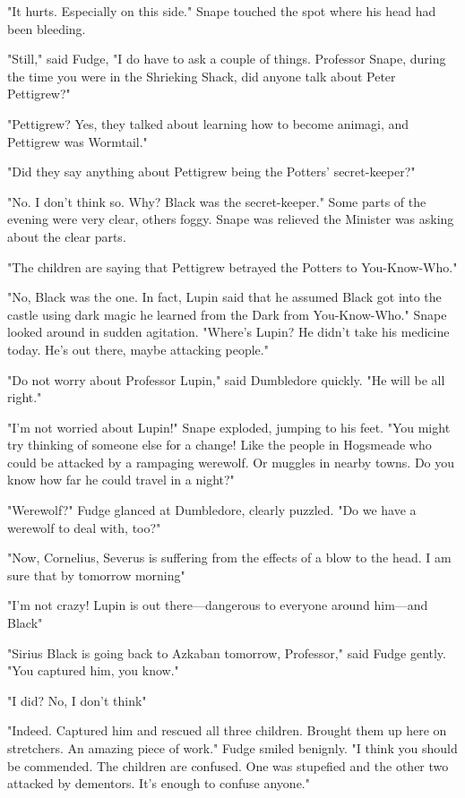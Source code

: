 "It hurts. Especially on this side." Snape touched the spot where his head had been bleeding.

"Still," said Fudge, "I do have to ask a couple of things. Professor Snape, during the time you were in the Shrieking Shack, did anyone talk about Peter Pettigrew?"

"Pettigrew? Yes, they talked about learning how to become animagi, and Pettigrew was Wormtail."

"Did they say anything about Pettigrew being the Potters' secret-keeper?"

"No. I don't think so. Why? Black was the secret-keeper." Some parts of the evening were very clear, others foggy. Snape was relieved the Minister was asking about the clear parts.

"The children are saying that Pettigrew betrayed the Potters to{\el} You-Know-Who."

"No, Black was the one. In fact, Lupin said that he assumed Black got into the castle using dark magic he learned from the Dark{\el} from You-Know-Who." Snape looked around in sudden agitation. "Where's Lupin? He didn't take his medicine today. He's out there, maybe attacking people."

"Do not worry about Professor Lupin," said Dumbledore quickly. "He will be all right."

"I'm not worried about Lupin!" Snape exploded, jumping to his feet. "You might try thinking of someone else for a change! Like the people in Hogsmeade who could be attacked by a rampaging werewolf. Or muggles in nearby towns. Do you know how far he could travel in a night?"

"Werewolf?" Fudge glanced at Dumbledore, clearly puzzled. "Do we have a werewolf to deal with, too?"

"Now, Cornelius, Severus is suffering from the effects of a blow to the head. I am sure that by tomorrow morning{\el}"

"I'm not crazy! Lupin is out there—dangerous to everyone around him—and Black{\el}"

"Sirius Black is going back to Azkaban tomorrow, Professor," said Fudge gently. "You captured him, you know."

"I did? No, I don't think{\el}"

"Indeed. Captured him and rescued all three children. Brought them up here on stretchers. An amazing piece of work." Fudge smiled benignly. "I think you should be commended. The children are confused. One was stupefied and the other two attacked by dementors. It's enough to confuse anyone."

